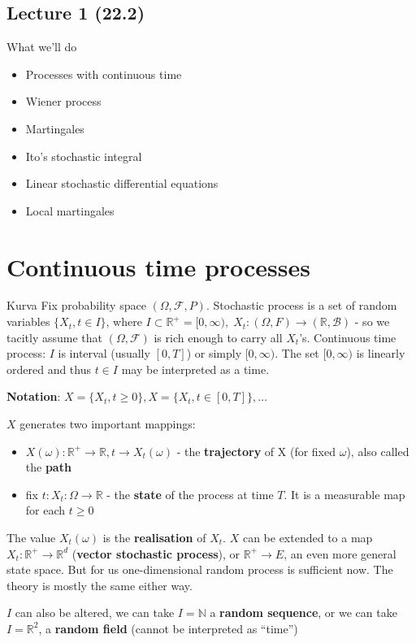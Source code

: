 \documentclass[english]{article}
\newcommand{\R}{\mathbb{R}}
\newcommand{\N}{\mathbb{N}}
\newcommand{\note}[1]{\noindent\textbf{#1}}
\newcommand{\F}{\mathcal F}
\newcommand{\B}{\mathcal B}
\begin{document}
\subsection*{Lecture 1 (22.2)}
What we'll do
\begin{itemize}
\item Processes with continuous time
\item Wiener process
\item Martingales
\item Ito's stochastic integral
\item Linear stochastic differential equations
\item Local martingales
\end{itemize}

\section{Continuous time processes}
Kurva Fix probability space $(\Omega, \F, P)$. Stochastic process is a set of random variables $\{X_t, t\in I\}$, where $I\subset \R^+ = [0,\infty),\; X_t:(\Omega, F) \to (\R,\B)$ - so we tacitly assume that $(\Omega, \F)$ is rich enough to carry all $X_t$'s. \newline
Continuous time process: $I$ is interval (usually $[0,T]$) or simply $[0,\infty)$. The set $[0,\infty)$ is linearly ordered and thus $t\in I$ may be interpreted as a time.\newline

\note{Notation}: $X=\{X_t, t\geq 0\}, X=\{X_t, t\in [0,T]\},\dots$ \newline

\noindent $X$ generates two important mappings:
\begin{itemize}
\item $X(\omega): \R^+ \to \R, t \to X_t (\omega)$ - the \textbf{trajectory} of X (for fixed $\omega$), also called the \textbf{path}
\item fix $t: X_t: \Omega \to \R$ - the \textbf{state} of the process at time $T$. It is a measurable map for each $t\geq 0$
\end{itemize}
The value $X_t(\omega)$ is the \textbf{realisation} of $X_t$. $X$ can be extended to a map $X_t: \R^+\to \R^d$ (\textbf{vector stochastic process}), or $\R^+ \to E$, an even more general state space. But for us one-dimensional random process is sufficient now. The theory is mostly the same either way. \newline

\noindent $I$ can also be altered, we can take $I=\N$ a \textbf{random sequence}, or we can take $I=\R^2$, a \textbf{random field} (cannot be interpreted as ``time'')\newline
\end{document}
